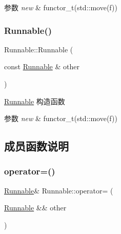 \begin{DoxyParams}{参数}
{\em new} & functor\+\_\+t(std\+::move(f)) \\
\hline
\end{DoxyParams}
\mbox{\label{classRunnable_a316ac005c1584a21b458fc673c04aed8}} 
\subsubsection{\texorpdfstring{Runnable()}{Runnable()}\hspace{0.1cm}{\footnotesize\ttfamily [4/4]}}
{\footnotesize\ttfamily Runnable\+::\+Runnable (\begin{DoxyParamCaption}\item[{const \hyperlink{classRunnable}{Runnable} \&}]{other }\end{DoxyParamCaption})\hspace{0.3cm}{\ttfamily [inline]}}



\hyperlink{classRunnable}{Runnable} 构造函数 


\begin{DoxyParams}{参数}
{\em new} & functor\+\_\+t(std\+::move(f)) \\
\hline
\end{DoxyParams}


\subsection{成员函数说明}
\mbox{\label{classRunnable_a3ee19e0ee460449458ca79274908aef3}} 
\subsubsection{\texorpdfstring{operator=()}{operator=()}\hspace{0.1cm}{\footnotesize\ttfamily [1/2]}}
{\footnotesize\ttfamily \hyperlink{classRunnable}{Runnable}\& Runnable\+::operator= (\begin{DoxyParamCaption}\item[{\hyperlink{classRunnable}{Runnable} \&\&}]{other }\end{DoxyParamCaption})\hspace{0.3cm}{\ttfamily [inline]}}



